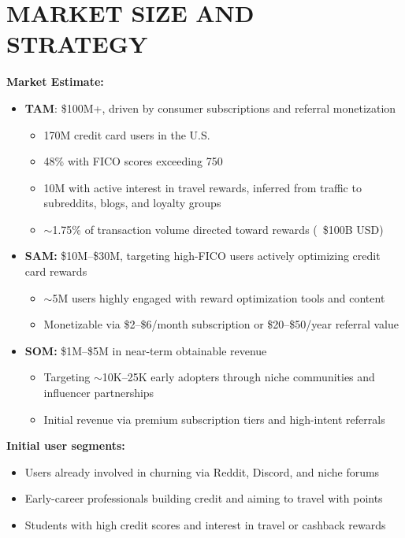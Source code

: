 \newpage
\section{MARKET SIZE AND STRATEGY}
\textbf{Market Estimate:}
\vspace{-0.5em}
\begin{itemize}[noitemsep]
    \item \textbf{TAM}: \$100M+, driven by consumer subscriptions and referral monetization
    \begin{itemize}
        \item 170M credit card users in the U.S.
        \item 48\% with FICO scores exceeding 750
        \item 10M with active interest in travel rewards, inferred from traffic to subreddits, blogs, and loyalty groups
        \item $\sim$1.75\% of transaction volume directed toward rewards (~\$100B USD)
    \end{itemize}
    
    \item \textbf{SAM:} \$10M--\$30M, targeting high-FICO users actively optimizing credit card rewards
    \begin{itemize}
        \item $\sim$5M users highly engaged with reward optimization tools and content
        \item Monetizable via \$2--\$6/month subscription or \$20--\$50/year referral value
    \end{itemize}
    
    \item \textbf{SOM:} \$1M--\$5M in near-term obtainable revenue
    \begin{itemize}
        \item Targeting $\sim$10K--25K early adopters through niche communities and influencer partnerships
        \item Initial revenue via premium subscription tiers and high-intent referrals
    \end{itemize}
\end{itemize}
\vspace{-0.5em}

\textbf{Initial user segments:}
\vspace{-0.5em}
\begin{itemize}[noitemsep]
\item Users already involved in churning via Reddit, Discord, and niche forums
\item Early-career professionals building credit and aiming to travel with points
\item Students with high credit scores and interest in travel or cashback rewards
\end{itemize}
\vspace{-0.5em}

